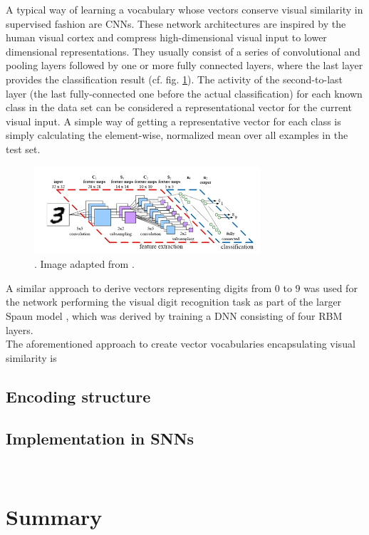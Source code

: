 A typical way of learning a vocabulary whose vectors conserve visual similarity in supervised fashion are \acp{CNN}.
These network architectures are inspired by the human visual cortex and compress high-dimensional visual input to lower dimensional representations.
They usually consist of a series of convolutional and pooling layers followed by one or more fully connected layers, where the last layer provides the classification result (cf. fig. \ref{fig:CNN_arch}).
The activity of the second-to-last layer (the last fully-connected one before the actual classification) for each known class in the data set can be considered a representational vector for the current visual input.
A simple way of getting a representative vector for each class is simply calculating the element-wise, normalized mean over all examples in the test set.
\begin{figure}[t]
	\centering
	\includegraphics[width=0.75\textwidth]{imgs/CNNArchitecture.jpg}
	\caption{. Image adapted from \cite{Peemen2011}.}
	\label{fig:CNN_arch}
\end{figure}
A similar approach to derive vectors representing digits from $0$ to $9$ was used for the network performing the visual digit recognition task as part of the larger \ac{Spaun} model \cite{Eliasmith2012}, which was derived by training a \ac{DNN} consisting of four \ac{RBM} layers.
\\
The aforementioned approach to create vector vocabularies encapsulating visual similarity is 
\subsection{Encoding structure}
\subsection{Implementation in \acp{SNN}}

\\
\section{Summary}

